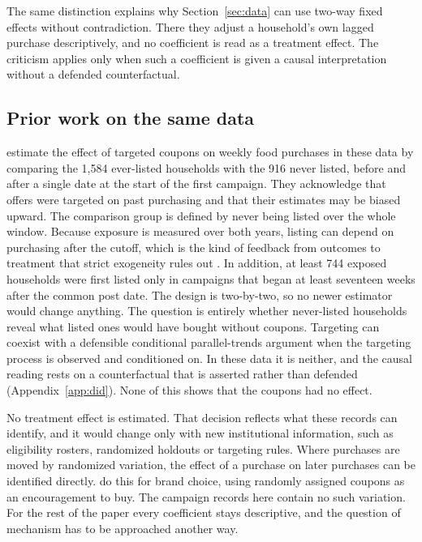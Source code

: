 \documentclass[11pt]{article}
\begin{document}
The same distinction explains why Section~\ref{sec:data} can use two-way fixed effects
without contradiction. There they adjust a household's own lagged purchase descriptively, and
no coefficient is read as a treatment effect. The criticism applies only when such a
coefficient is given a causal interpretation without a defended counterfactual.

\subsection{Prior work on the same data}

\citet{guan_atlas_vadiveloo} estimate the effect of targeted coupons on weekly food purchases
in these data by comparing the 1,584 ever-listed households with the 916 never listed, before
and after a single date at the start of the first campaign. They acknowledge that offers were
targeted on past purchasing and that their estimates may be biased upward. The comparison
group is defined by never being listed over the whole window. Because exposure is measured over
both years, listing can depend on purchasing after the cutoff, which is the kind of
feedback from outcomes to treatment that strict exogeneity rules out \citep{imai_kim}. In
addition, at least 744 exposed households were first listed only in campaigns that began at
least seventeen weeks after the common post date. The design is two-by-two, so no newer estimator would change
anything. The question is entirely whether never-listed households reveal what listed ones
would have bought without coupons. Targeting can coexist with a defensible conditional
parallel-trends argument when the targeting process is observed and conditioned on. In these
data it is neither, and the causal reading rests on a counterfactual that is asserted rather
than defended (Appendix~\ref{app:did}). None of this shows that the coupons had no effect.

No treatment effect is estimated. That decision reflects what these records can identify, and
it would change only with new institutional information, such as eligibility
rosters, randomized holdouts or targeting rules. Where purchases are moved by randomized
variation, the effect of a purchase on later purchases can be identified directly.
\citet{gabel2026} do this for brand choice, using randomly assigned coupons as an encouragement
to buy. The campaign records here contain no such variation. For the rest of the paper every
coefficient stays descriptive, and the question of mechanism has to be approached another way.
\end{document}
